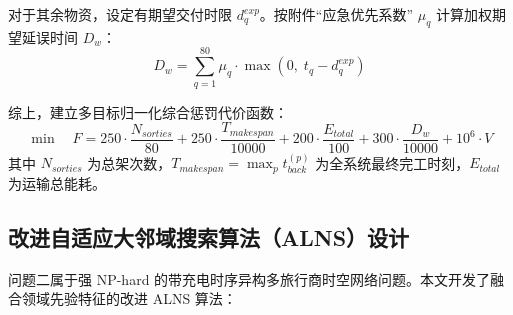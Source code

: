 对于其余物资，设定有期望交付时限 $d_q^{exp}$。按附件“应急优先系数” $\mu_q$ 计算加权期望延误时间 $D_w$：
\begin{equation}
    D_w = \sum_{q=1}^{80} \mu_q \cdot \max\left(0, \; t_q - d_q^{exp}\right)
\end{equation}

综上，建立多目标归一化综合惩罚代价函数：
\begin{equation}
    \min \quad F = 250 \cdot \frac{N_{sorties}}{80} + 250 \cdot \frac{T_{makespan}}{10000} + 200 \cdot \frac{E_{total}}{100} + 300 \cdot \frac{D_w}{10000} + 10^6 \cdot V
    \label{eq:q2_objective}
\end{equation}
其中 $N_{sorties}$ 为总架次数，$T_{makespan} = \max_p t_{back}^{(p)}$ 为全系统最终完工时刻，$E_{total}$ 为运输总能耗。

\subsection{改进自适应大邻域搜索算法（ALNS）设计}

问题二属于强 NP-hard 的带充电时序异构多旅行商时空网络问题。本文开发了融合领域先验特征的改进 ALNS 算法：


